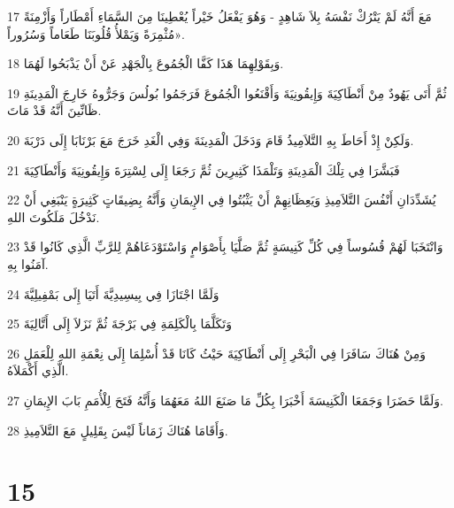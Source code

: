 \par 17 مَعَ أَنَّهُ لَمْ يَتْرُكْ نَفْسَهُ بِلاَ شَاهِدٍ - وَهُوَ يَفْعَلُ خَيْراً يُعْطِينَا مِنَ السَّمَاءِ أَمْطَاراً وَأَزْمِنَةً مُثْمِرَةً وَيَمْلأُ قُلُوبَنَا طَعَاماً وَسُرُوراً».
\par 18 وَبِقَوْلِهِمَا هَذَا كَفَّا الْجُمُوعَ بِالْجَهْدِ عَنْ أَنْ يَذْبَحُوا لَهُمَا.
\par 19 ثُمَّ أَتَى يَهُودٌ مِنْ أَنْطَاكِيَةَ وَإِيقُونِيَةَ وَأَقْنَعُوا الْجُمُوعَ فَرَجَمُوا بُولُسَ وَجَرُّوهُ خَارِجَ الْمَدِينَةِ ظَانِّينَ أَنَّهُ قَدْ مَاتَ.
\par 20 وَلَكِنْ إِذْ أَحَاطَ بِهِ التَّلاَمِيذُ قَامَ وَدَخَلَ الْمَدِينَةَ وَفِي الْغَدِ خَرَجَ مَعَ بَرْنَابَا إِلَى دَرْبَةَ.
\par 21 فَبَشَّرَا فِي تِلْكَ الْمَدِينَةِ وَتَلْمَذَا كَثِيرِينَ ثُمَّ رَجَعَا إِلَى لِسْتِرَةَ وَإِيقُونِيَةَ وَأَنْطَاكِيَةَ
\par 22 يُشَدِّدَانِ أَنْفُسَ التَّلاَمِيذِ وَيَعِظَانِهِمْ أَنْ يَثْبُتُوا فِي الإِيمَانِ وَأَنَّهُ بِضِيقَاتٍ كَثِيرَةٍ يَنْبَغِي أَنْ نَدْخُلَ مَلَكُوتَ اللهِ.
\par 23 وَانْتَخَبَا لَهُمْ قُسُوساً فِي كُلِّ كَنِيسَةٍ ثُمَّ صَلَّيَا بِأَصْوَامٍ وَاسْتَوْدَعَاهُمْ لِلرَّبِّ الَّذِي كَانُوا قَدْ آمَنُوا بِهِ.
\par 24 وَلَمَّا اجْتَازَا فِي بِيسِيدِيَّةَ أَتَيَا إِلَى بَمْفِيلِيَّةَ
\par 25 وَتَكَلَّمَا بِالْكَلِمَةِ فِي بَرْجَةَ ثُمَّ نَزَلاَ إِلَى أَتَّالِيَةَ
\par 26 وَمِنْ هُنَاكَ سَافَرَا فِي الْبَحْرِ إِلَى أَنْطَاكِيَةَ حَيْثُ كَانَا قَدْ أُسْلِمَا إِلَى نِعْمَةِ اللهِ لِلْعَمَلِ الَّذِي أَكْمَلاَهُ.
\par 27 وَلَمَّا حَضَرَا وَجَمَعَا الْكَنِيسَةَ أَخْبَرَا بِكُلِّ مَا صَنَعَ اللهُ مَعَهُمَا وَأَنَّهُ فَتَحَ لِلْأُمَمِ بَابَ الإِيمَانِ.
\par 28 وَأَقَامَا هُنَاكَ زَمَاناً لَيْسَ بِقَلِيلٍ مَعَ التَّلاَمِيذِ.

\chapter{15}


